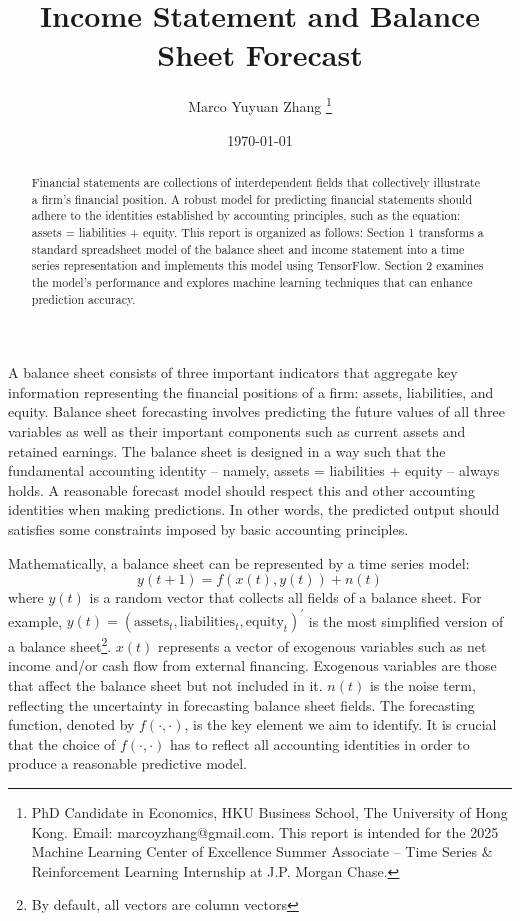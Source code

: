 \documentclass[12pt]{article}
\title{Income Statement and Balance Sheet Forecast}
\author{Marco Yuyuan Zhang  \thanks{PhD Candidate in Economics, HKU Business School, The University of Hong Kong. Email: marcoyzhang@gmail.com. This report is intended for the 2025 Machine Learning Center of Excellence Summer Associate – Time Series \& Reinforcement Learning Internship at J.P. Morgan Chase.}}
\date{\today}
\numberwithin{equation}{section}
\begin{document}
\maketitle
	
\begin{abstract}
	Financial statements are collections of interdependent fields that collectively illustrate a firm's financial position. A robust model for predicting financial statements should adhere to the identities established by accounting principles, such as the equation: assets = liabilities + equity. This report is organized as follows: Section 1 transforms a standard spreadsheet model of the balance sheet and income statement into a time series representation and implements this model using TensorFlow. Section 2 examines the model's performance and explores machine learning techniques that can enhance prediction accuracy.
\end{abstract}

\pagebreak



A balance sheet consists of three important indicators that aggregate key information representing the financial positions of a firm: assets, liabilities, and equity. Balance sheet forecasting involves predicting the future values of all three variables as well as their important components such as current assets and retained earnings. The balance sheet is designed in a way such that the fundamental accounting identity -- namely, assets = liabilities + equity -- always holds. A reasonable forecast model should respect this and other accounting identities when making predictions. In other words, the predicted output should satisfies some constraints imposed by basic accounting principles.

Mathematically, a balance sheet can be represented by a time series model:
\begin{equation}
	\label{eq:model}
	y(t+1) = f(x(t), y(t)) + n(t)
\end{equation}
where $y(t)$ is a random vector that collects all fields of a balance sheet. For example, $y(t) = (\text{assets}_{t},\text{liabilities}_{t},\text{equity}_{t})^{'}$ is the most simplified version of a balance sheet\footnote{By default, all vectors are column vectors}. $x(t)$ represents a vector of exogenous variables such as net income and/or cash flow from external financing. Exogenous variables are those that affect the balance sheet but not included in it. $n(t)$ is the noise term, reflecting the uncertainty in forecasting balance sheet fields. The forecasting function, denoted by $f(\cdot,\cdot)$, is the key element we aim to identify. It is crucial that the choice of $f(\cdot,\cdot)$ has to reflect all accounting identities in order to produce a reasonable predictive model.
 
\end{document}
